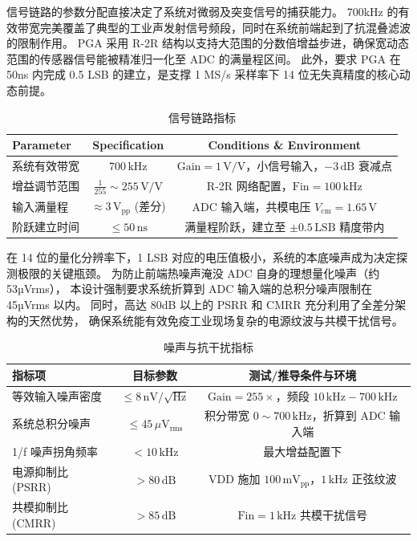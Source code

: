 信号链路的参数分配直接决定了系统对微弱及突变信号的捕获能力。
700kHz 的有效带宽完美覆盖了典型的工业声发射信号频段，同时在系统前端起到了抗混叠滤波的限制作用。
PGA 采用 R-2R 结构以支持大范围的分数倍增益步进，确保宽动态范围的传感器信号能被精准归一化至 ADC 的满量程区间。
此外，要求 PGA 在 50ns 内完成 0.5 LSB 的建立，是支撑 1 MS/s 采样率下 14 位无失真精度的核心动态前提。
\begin{table}[htbp]
  \centering
  \caption{信号链路指标}
  \begin{tabular}{lcc}
    \toprule
    Parameter & Specification & Conditions \& Environment \\
    \midrule
    系统有效带宽 & $700\,\text{kHz}$ & $\text{Gain} = 1\,\text{V/V}$，小信号输入，$-3\,\text{dB}$ 衰减点 \\
    增益调节范围 & $\frac{1}{255} \sim 255\,\text{V/V}$ & R-2R 网络配置，$\text{Fin} = 100\,\text{kHz}$ \\
    输入满量程 & $\approx 3\,\text{V}_\text{pp}$ (差分) & ADC 输入端，共模电压 $V_\text{cm} = 1.65\,\text{V}$ \\
    阶跃建立时间 & $\le 50\,\text{ns}$ & 满量程阶跃，建立至 $\pm 0.5\,\text{LSB}$ 精度带内 \\
    \bottomrule
  \end{tabular}
  \label{tab:signal_chain_spec}
\end{table}

在 14 位的量化分辨率下，1 LSB 对应的电压值极小，系统的本底噪声成为决定探测极限的关键瓶颈。
为防止前端热噪声淹没 ADC 自身的理想量化噪声（约 53µVrms），
本设计强制要求系统折算到 ADC 输入端的总积分噪声限制在 45µVrms 以内。
同时，高达 80dB 以上的 PSRR 和 CMRR 充分利用了全差分架构的天然优势，
确保系统能有效免疫工业现场复杂的电源纹波与共模干扰信号。
\begin{table}[htbp]
  \centering
  \caption{噪声与抗干扰指标}
  \begin{tabular}{lcc}
    \toprule
    指标项 & 目标参数 & 测试/推导条件与环境 \\
    \midrule
    等效输入噪声密度 & $\le 8\,\text{nV}/\sqrt{\text{Hz}}$ & $\text{Gain} = 255\times$，频段 $10\,\text{kHz} - 700\,\text{kHz}$ \\
    系统总积分噪声 & $\le 45\,\mu\text{V}_\text{rms}$ & 积分带宽 $0 \sim 700\,\text{kHz}$，折算到 ADC 输入端 \\
    1/f 噪声拐角频率 & $< 10\,\text{kHz}$ & 最大增益配置下 \\
    电源抑制比 (PSRR) & $> 80\,\text{dB}$ & $\text{VDD}$ 施加 $100\,\text{mV}_\text{pp}$，$1\,\text{kHz}$ 正弦纹波 \\
    共模抑制比 (CMRR) & $> 85\,\text{dB}$ & $\text{Fin} = 1\,\text{kHz}$ 共模干扰信号 \\
    \bottomrule
  \end{tabular}
  \label{tab:noise_spec}
\end{table}

